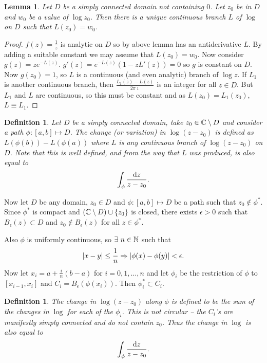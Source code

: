 \documentclass{notes}
\theoremstyle{plain}
\newtheorem{definition}[proposition]{Definition}
\newtheorem{lemma}[proposition]{Lemma}
\begin{document}
\begin{lemma}
Let $D$ be a simply connected domain not containing $0$.  Let $z_0$ be in
$D$ and $w_0$ be a value of $\log z_0$.  Then there is a unique continuous
branch $L$ of $\log$ on $D$ such that $L(z_0) = w_0$.
\end{lemma}

\begin{proof}
$f(z) = \frac{1}{z}$ is analytic on $D$ so by above lemma has an antiderivative
$L$.  By adding a suitable constant we may assume that $L(z_0) = w_0$.  Now
consider $g(z) = z e^{-L(z)}$.  $g'(z) = e^{-L(z)}(1-z L'(z)) = 0$ so
$g$ is constant on $D$.  Now $g(z_0) = 1$, so $L$ is a continuous (and even
analytic) branch of $\log z$.  If $L_1$ is another continuous branch, then
$\frac{L_1(z) - L(z)}{2 \pi \imath}$ is an integer for all $z \in D$.  But
$L_1$ and $L$ are continuous, so this must be constant and as $L(z_0) =
L_1(z_0)$, $L \equiv L_1$.
\end{proof}

\begin{definition}
  Let $D$ be a simply connected domain, take $z_0 \in \mathbb{C} \setminus D$
  and consider a path ${\phi \colon [a,b] \mapsto D}$.  The change (or
  variation) in
$\log (z-z_0)$%
%
is defined as $L(\phi(b)) - L(\phi(a))$ where $L$ is any continuous branch
of $\log (z-z_0)$ on $D$.  Note that this is well defined, and from the way
that $L$ was produced, is also equal to
\[
\int_\phi \frac{\mathrm{d} z}{z-z_0}.
\]
\end{definition}

Now let $D$ be any domain, $z_0 \in D$ and $\phi \colon [a,b] \mapsto D$ be a
path such that $z_0 \notin \phi^*$.  Since $\phi^*$ is compact and
$(\mathbb{C} \setminus D) \cup \{ z_0 \}$ is closed, there exists $\epsilon > 0$
such that $B_\epsilon(z) \subset D$ and $z_0 \notin B_\epsilon(z)$ for all
$z \in \phi^*$. 

Also $\phi$ is uniformly continuous, so $\exists\ n \in \mathbb{N}$ such that
\[
\left|x-y\right| \le \frac{1}{n} \Rightarrow \left|\phi(x) - \phi(y)\right| <
\epsilon.
\]
Now let $x_i = a + \frac{i}{n} (b-a)$ for $i = 0, 1, \dots, n$ and let
$\phi_i$ be the restriction of $\phi$ to $[x_{i-1},x_i]$ and
$C_i = B_\epsilon(\phi(x_i))$.  Then $\phi_i^* \subset C_i$.

\begin{definition}
The change in $\log (z-z_0)$ along $\phi$%
 is defined to be the sum of the changes in $\log$
for each of the $\phi_i$.  This is not circular -- the $C_i$'s are manifestly
simply connected and do not contain $z_0$.  Thus the change in $\log$ is
also equal to
\[
\int_\phi \frac{\mathrm{d} z}{z-z_0}.
\]
\end{definition}
\end{document}
